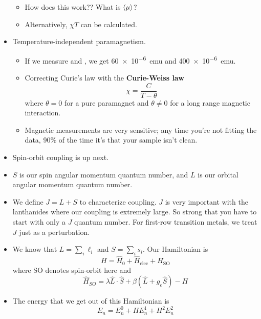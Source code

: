 \documentclass[../notes.tex]{subfiles}
\begin{document}
\begin{itemize}
    \begin{itemize}
        \item How does this work?? What is $\left\langle{\mu}\right\rangle$?
        \item Alternatively, $\chi T$ can be calculated.
    \end{itemize}
    \item Temperature-independent paramagnetism.
    \begin{itemize}
        \item If we measure  and , we get \SI{60e-6}{emu} and \SI{400e-6}{emu}.
        \item Correcting Curie's law with the \textbf{Curie-Weiss law}
        \begin{equation*}
            \chi = \frac{C}{T-\theta}
        \end{equation*}
        where $\theta=0$ for a pure paramagnet and $\theta\neq 0$ for a long range magnetic interaction.
        \item Magnetic measurements are very sensitive; any time you're not fitting the data, 90\% of the time it's that your sample isn't clean.
    \end{itemize}
    \item Spin-orbit coupling is up next.
    \item $S$ is our spin angular momentum quantum number, and $L$ is our orbital angular momentum quantum number.
    \item We define $J=L+S$ to characterize coupling. $J$ is very important with the lanthanides where our coupling is extremely large. So strong that you have to start with only a $J$ quantum number. For first-row transition metals, we treat $J$ just as a perturbation.
    \item We know that $L=\sum_i\ell_i$ and $S=\sum_is_i$. Our Hamiltonian is
    \begin{equation*}
        H = \hat{H}_0+\hat{H}_\text{elec}+\hat{H}_\text{SO}
    \end{equation*}
    where SO denotes spin-orbit here and
    \begin{equation*}
        \hat{H}_{SO} = \lambda\hat{L}\cdot\hat{S}+\beta(\hat{L}+g_e\hat{S})-H
    \end{equation*}
    \item The energy that we get out of this Hamiltonian is
    \begin{equation*}
        E_n = E_n^0+HE_n^1+H^2E_n^2
    \end{equation*}
    \begin{itemize}

\end{itemize}
\end{itemize}
\end{document}
